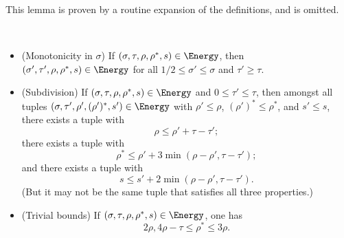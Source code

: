 This lemma is proven by a routine expansion of the definitions, and is omitted.

\begin{lemma}\label{lve-basic}\
    \begin{itemize}
        \item[(i)] (Monotonicity in $\sigma$) If $(\sigma,\tau,\rho,\rho^*,s) \in \Energy$, then
        $(\sigma',\tau',\rho,\rho^*,s) \in \Energy$ for all $1/2 \leq \sigma' \leq \sigma$ and $\tau' \geq \tau$.
        \item[(ii)] (Subdivision) If $(\sigma,\tau,\rho,\rho^*,s) \in \Energy$ and $0 \leq \tau' \leq \tau$, then amongst all tuples $(\sigma,\tau', \rho', (\rho')^*,s') \in \Energy$ with $\rho' \leq \rho$, $(\rho')^* \leq \rho^*$, and $s' \leq s$, there exists a tuple with
        $$\rho \leq \rho' + \tau - \tau';$$
        there exists a tuple with
        $$\rho^* \leq \rho' + 3\min(\rho-\rho',\tau-\tau');$$
        and there exists a tuple with
        $$s \leq s' + 2\min(\rho-\rho',\tau-\tau').$$
        (But it may not be the same tuple that satisfies all three properties.)
        \item[(iii)]  (Trivial bounds) If $(\sigma,\tau,\rho,\rho^*,s) \in \Energy$, one has
        $$ 2\rho, 4\rho-\tau \leq \rho^* \leq 3 \rho.$$
    \end{itemize}
\end{lemma}

